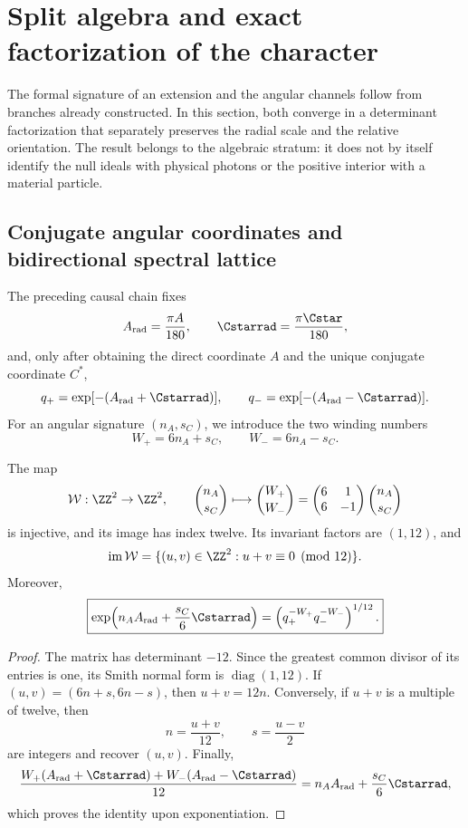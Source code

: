 \chapter{Split algebra and exact factorization of the character}
\label{chap:factorizacion-split}

The formal signature of an extension and the angular channels follow from branches already constructed. In this section, both converge in a determinant factorization that separately preserves the radial scale and the relative orientation. The result belongs to the algebraic stratum: it does not by itself identify the null ideals with physical photons or the positive interior with a material particle.

\section{Conjugate angular coordinates and bidirectional spectral lattice}
\label{sec:reticula-angular-split}

The preceding causal chain fixes
\[
 A_{\rm rad}=\frac{\pi A}{180},\qquad
 \Cstarrad=\frac{\pi\Cstar}{180},
\]
and, only after obtaining the direct coordinate \(A\) and the unique
conjugate coordinate \(C^*\),
\[
 q_+=\exp[-(A_{\rm rad}+\Cstarrad)],
 \qquad
 q_-=\exp[-(A_{\rm rad}-\Cstarrad)].
\]
For an angular signature \((n_A,s_C)\), we introduce the two winding
numbers
\[
 W_+=6n_A+s_C,
 \qquad
 W_-=6n_A-s_C.
\]

\begin{theorem}
\label{thm:reticula-two-way}
The map
\[
 \mathcal W:\ZZ^2\to\ZZ^2,
 \qquad
 \binom{n_A}{s_C}\longmapsto
 \binom{W_+}{W_-}
 =\begin{pmatrix}6&1\\6&-1\end{pmatrix}
 \binom{n_A}{s_C}
\]
is injective, and its image has index twelve. Its invariant factors are
\((1,12)\), and
\[
 \operatorname{im}\mathcal W
 =\{(u,v)\in\ZZ^2:u+v\equiv0\pmod{12}\}.
\]
Moreover,
\[
 \boxed{
 \exp\!\left(n_AA_{\rm rad}+\frac{s_C}{6}\Cstarrad\right)
 =\left(q_+^{-W_+}q_-^{-W_-}\right)^{1/12}.}
\]
\end{theorem}

\begin{proof}
The matrix has determinant \(-12\). Since the greatest common divisor of its
entries is one, its Smith normal form is
\(\operatorname{diag}(1,12)\). If
\((u,v)=(6n+s,6n-s)\), then \(u+v=12n\). Conversely, if
\(u+v\) is a multiple of twelve, then
\[
 n=\frac{u+v}{12},
 \qquad
 s=\frac{u-v}{2}
\]
are integers and recover \((u,v)\). Finally,
\[
 \frac{W_+(A_{\rm rad}+\Cstarrad)
       +W_-(A_{\rm rad}-\Cstarrad)}{12}
 =n_AA_{\rm rad}+\frac{s_C}{6}\Cstarrad,
\]
which proves the identity upon exponentiation.
\end{proof}

